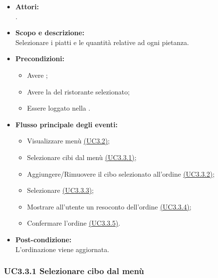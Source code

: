 \begin{itemize}
	\item \textbf{Attori:}
	\\.
	\item \textbf{Scopo e descrizione:} 
	\\Selezionare i piatti e le quantità relative ad ogni pietanza.
	\item \textbf{Precondizioni:}
	\begin{itemize}
		\item Avere ;
		\item Avere la  del ristorante selezionato;
		\item Essere loggato nella .
	\end{itemize}
	\item \textbf{Flusso principale degli eventi:}
	\begin{itemize}
		\item Visualizzare menù \hyperref[UC3.2]{(UC3.2)};
		\item Selezionare cibi dal menù \hyperref[UC3.3.1]{(UC3.3.1)};
		\item Aggiungere/Rimuovere il cibo selezionato all'ordine \hyperref[UC3.3.2]{(UC3.3.2)};
		\item Selezionare  \hyperref[UC3.3.3]{(UC3.3.3)};
		\item Mostrare all'utente un resoconto dell'ordine \hyperref[UC3.3.4]{(UC3.3.4)};
		\item Confermare l'ordine \hyperref[UC3.3.5]{(UC3.3.5)}.
	\end{itemize}
	\item \textbf{Post-condizione:}
	\\L'ordinazione viene aggiornata.
\end{itemize}

\subsubsection{UC3.3.1 Selezionare cibo dal menù} \label{UC3.3.1}

